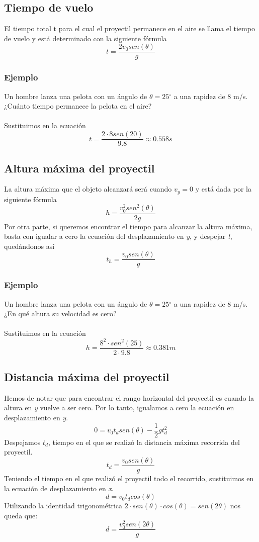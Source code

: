 \documentclass{article}
\begin{document}
\subsection{Tiempo de vuelo}
El tiempo total t para el cual el proyectil permanece en el aire se llama el tiempo de  vuelo y está determinado con la siguiente fórmula \[t=\frac{2v_{0}sen(\theta)}{g}\]

\subsubsection{Ejemplo} Un hombre lanza una pelota con un ángulo de \(\theta=25\)$^{\circ}$ a una rapidez de 8 m/s. ¿Cuánto tiempo permanece la pelota en el aire?\\\\
Sustituimos en la ecuación \[t=\frac{2\cdot 8 sen(20)}{9.8}\approx 0.558 s\]

\subsection{Altura máxima del proyectil}
La altura máxima que el objeto alcanzará será cuando \(v_{y}=0\) y está dada por la siguiente fórmula
\[h=\frac{v^2_{0}sen^2(\theta)}{2g}\]
Por otra parte, si queremos encontrar el tiempo para alcanzar la altura máxima, basta con igualar a cero la ecuación del desplazamiento en \textit{y}, y despejar \textit{t}, quedándonos así\[t_{h}=\frac{v_{0}sen(\theta)}{g}\]

\subsubsection{Ejemplo} Un hombre lanza una pelota con un ángulo de \(\theta=25\)$^{\circ}$ a una rapidez de 8 m/s. ¿En qué altura su velocidad es cero?\\\\
Sustituimos en la ecuación \[h=\frac{8^2 \cdot sen^2(25)}{2 \cdot 9.8} \approx 0.381 m\]

\subsection{Distancia máxima del proyectil}
Hemos de notar que para encontrar el rango horizontal del proyectil es cuando la altura en \textit{y} vuelve a ser cero. Por lo tanto, igualamos a cero la ecuación en desplazamiento en \textit{y}.
\[0=v_{0} t_{d} sen(\theta)-\frac{1}{2}gt^2_{d}\]
Despejamos \textit{\(t_{d}\)}, tiempo en el que se realizó la distancia máxima recorrida del proyectil. \[t_{d}=\frac{v_{0}sen(\theta)}{g}\]
Teniendo el tiempo en el que realizó el proyectil todo el recorrido, sustituimos en la ecuación de desplazamiento en \textit{x}.
\[d=v_{0}t_{d}cos(\theta)\]
Utilizando la identidad trigonométrica \textit{\(2\cdot sen(\theta)\cdot cos(\theta)=sen(2\theta)\)} nos queda que:
\[d=\frac{v^2_{0}sen(2\theta)}{g}\]
\end{document}

